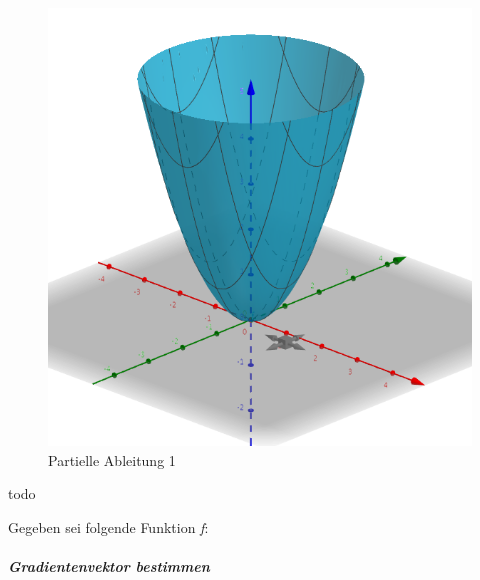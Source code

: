 \begin{figure}[!htb]
	\centering
	\includegraphics[width=.6\linewidth]{img/partAbl_1}
	\caption[Partielle Ableitung 1]{Partielle Ableitung 1 \protect\footnotemark}
	\label{fig:partAbl1}
\end{figure}

\FloatBarrier
{}


todo




Gegeben sei folgende Funktion \emph{f}: 


\subparagraph{Gradientenvektor bestimmen}
